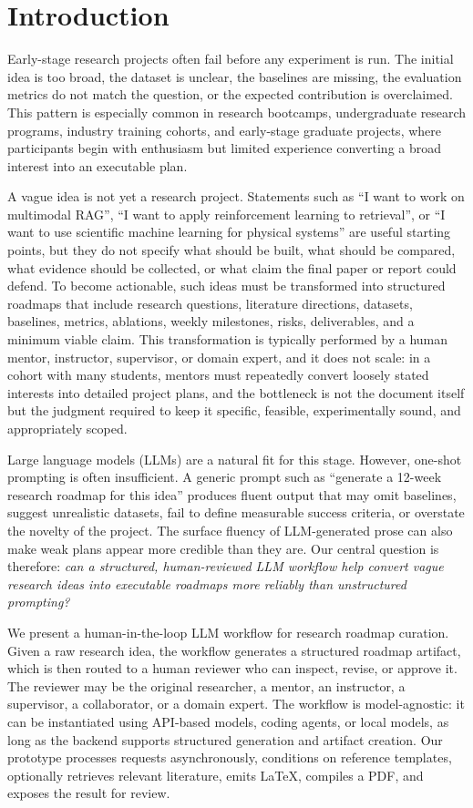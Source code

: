 \documentclass{article}
\begin{document}
\section{Introduction}
\label{sec:intro}

Early-stage research projects often fail before any experiment is run.
The initial idea is too broad, the dataset is unclear, the baselines are
missing, the evaluation metrics do not match the question, or the
expected contribution is overclaimed. This pattern is especially common
in research bootcamps, undergraduate research programs, industry
training cohorts, and early-stage graduate projects, where participants
begin with enthusiasm but limited experience converting a broad interest
into an executable plan.

A vague idea is not yet a research project. Statements such as ``I want
to work on multimodal RAG'', ``I want to apply reinforcement learning to
retrieval'', or ``I want to use scientific machine learning for physical
systems'' are useful starting points, but they do not specify what
should be built, what should be compared, what evidence should be
collected, or what claim the final paper or report could defend. To
become actionable, such ideas must be transformed into structured
roadmaps that include research questions, literature directions,
datasets, baselines, metrics, ablations, weekly milestones, risks,
deliverables, and a minimum viable claim. This transformation is
typically performed by a human mentor, instructor, supervisor, or domain
expert, and it does not scale: in a cohort with many students, mentors
must repeatedly convert loosely stated interests into detailed project
plans, and the bottleneck is not the document itself but the judgment
required to keep it specific, feasible, experimentally sound, and
appropriately scoped.

Large language models (LLMs) are a natural fit for this stage. However,
one-shot prompting is often insufficient. A generic prompt such as
``generate a 12-week research roadmap for this idea'' produces fluent
output that may omit baselines, suggest unrealistic datasets, fail to
define measurable success criteria, or overstate the novelty of the
project. The surface fluency of LLM-generated prose can also make weak
plans appear more credible than they are. Our central question is
therefore: \emph{can a structured, human-reviewed LLM workflow help
convert vague research ideas into executable roadmaps more reliably
than unstructured prompting?}

We present a human-in-the-loop LLM workflow for research roadmap
curation. Given a raw research idea, the workflow generates a structured
roadmap artifact, which is then routed to a human reviewer who can
inspect, revise, or approve it. The reviewer may be the original
researcher, a mentor, an instructor, a supervisor, a collaborator, or a
domain expert. The workflow is model-agnostic: it can be instantiated
using API-based models, coding agents, or local models, as long as the
backend supports structured generation and artifact creation. Our
prototype processes requests asynchronously, conditions on reference
templates, optionally retrieves relevant literature, emits LaTeX,
compiles a PDF, and exposes the result for review.
\end{document}

